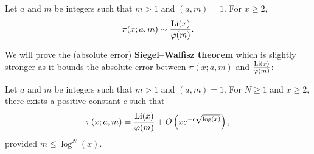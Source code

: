     \begin{theorem*}
      Let $a$ and $m$ be integers such that $m > 1$ and $(a,m) = 1$. For $x \ge 2$,
      \[
        \pi(x;a,m) \sim \frac{\operatorname{\mathrm{Li}}(x)}{\varphi(m)}.
      \]
    \end{theorem*}
    
    We will prove the (absolute error) \textbf{Siegel–Walfisz theorem} which is slightly stronger as it bounds the absolute error between $\pi(x;a,m)$ and $\frac{\operatorname{\mathrm{Li}}(x)}{\varphi(m)}$:

    \begin{theorem*}
      Let $a$ and $m$ be integers such that $m > 1$ and $(a,m) = 1$. For $N \ge 1$ and $x \ge 2$, there exists a positive constant $c$ such that
      \[
        \pi(x;a,m) = \frac{\operatorname{\mathrm{Li}}(x)}{\varphi(m)}+O\left(xe^{-c\sqrt{\log(x)}}\right),
      \]
      provided $m \le \log^{N}(x)$.
    \end{theorem*}
